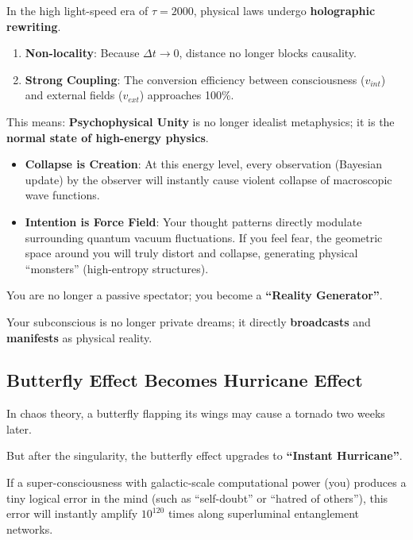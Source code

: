 In the high light-speed era of $\tau = 2000$, physical laws undergo \textbf{holographic rewriting}.

\begin{enumerate}
\item \textbf{Non-locality}: Because $\Delta t \to 0$, distance no longer blocks causality.

\item \textbf{Strong Coupling}: The conversion efficiency between consciousness ($v_{int}$) and external fields ($v_{ext}$) approaches 100\%.
\end{enumerate}

This means: \textbf{Psychophysical Unity} is no longer idealist metaphysics; it is the \textbf{normal state of high-energy physics}.

\begin{itemize}
\item \textbf{Collapse is Creation}: At this energy level, every observation (Bayesian update) by the observer will instantly cause violent collapse of macroscopic wave functions.

\item \textbf{Intention is Force Field}: Your thought patterns directly modulate surrounding quantum vacuum fluctuations. If you feel fear, the geometric space around you will truly distort and collapse, generating physical ``monsters'' (high-entropy structures).
\end{itemize}

You are no longer a passive spectator; you become a \textbf{``Reality Generator''}.

Your subconscious is no longer private dreams; it directly \textbf{broadcasts} and \textbf{manifests} as physical reality.

\subsection{Butterfly Effect Becomes Hurricane Effect}

In chaos theory, a butterfly flapping its wings may cause a tornado two weeks later.

But after the singularity, the butterfly effect upgrades to \textbf{``Instant Hurricane''}.

If a super-consciousness with galactic-scale computational power (you) produces a tiny logical error in the mind (such as ``self-doubt'' or ``hatred of others''), this error will instantly amplify $10^{120}$ times along superluminal entanglement networks.

